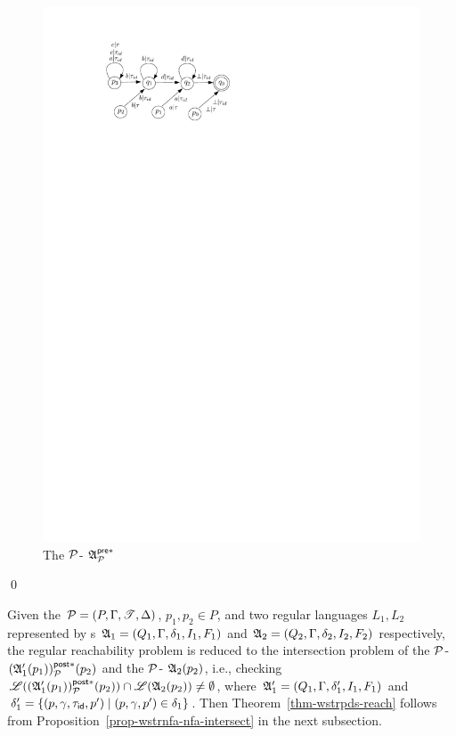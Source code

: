 \begin{example}
\begin{figure}[htb]
	\includegraphics[scale = 0.9]{saturation-example.pdf}
	\caption{The ${\mathcal{P} }$-{\WOTrNFA} ${\mathfrak{A} }^{{\mathsf{pre} }*}_{{\mathcal{P} }}$}\label{fig-saturation-exmp}
\end{figure}
\qed
\end{example}

Given the {\WOTrPDS} ${\mathcal{P} }= (P, \Gamma, {\mathscr{T} }, \Delta)$, $p_1, p_2 \in P$, and two regular languages $L_1, L_2$ represented by {\NFA}s ${\mathfrak{A} }_1 = (Q_1, \Gamma, \delta_1, I_1, F_1)$ and ${\mathfrak{A} }_2 = (Q_2, \Gamma, \delta_2, I_2, F_2)$ respectively, the regular reachability problem is reduced to the intersection problem of the ${\mathcal{P} }$-{\WOTrNFA} $({\mathfrak{A} }_1'(p_1))^{{\mathsf{post} }*}_{{\mathcal{P} }}(p_2)$ and the ${\mathcal{P} }$-{\NFA} ${\mathfrak{A} }_2(p_2)$, 
i.e., checking ${\mathscr{L} }(({\mathfrak{A} }_1'(p_1))^{{\mathsf{post} }*}_{{\mathcal{P} }}(p_2)) \cap {\mathscr{L} }({\mathfrak{A} }_2(p_2)) \neq \emptyset$, where ${\mathfrak{A} }_1' = (Q_1, \Gamma, \delta_1', I_1, F_1)$ and $\delta_1' = \{(p,\gamma,\tau_{\mathsf{id}}, p')\mid (p,\gamma,p')\in\delta_1\}$.
Then Theorem~\ref{thm-wstrpds-reach} follows from Proposition~\ref{prop-wstrnfa-nfa-intersect} in the next subsection.

